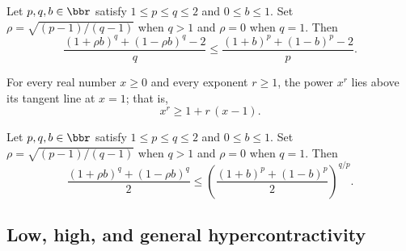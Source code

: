 \begin{lemma}
\label{BooleanAnalysis.Hypercontractivity.integrated_h_alpha_ineq}
\leanok
{}
Let $p,q,b\in\bbr$ satisfy $1\le p\le q\le2$ and $0\le b\le1$.
Set $\rho=\sqrt{(p-1)/(q-1)}$ when $q>1$ and $\rho=0$ when $q=1$. Then
\[
  \frac{(1+\rho b)^q+(1-\rho b)^q-2}{q}
  \le\frac{(1+b)^p+(1-b)^p-2}{p}.
\]
\end{lemma}

\begin{lemma}[Tangent line inequality for $x^r$ at $x=1$]
\label{BooleanAnalysis.Hypercontractivity.rpow_ge_one_add_mul_sub}
\leanok
{}
For every real number $x \ge 0$ and every exponent $r \ge 1$, the power $x^r$ lies above
its tangent line at $x = 1$; that is,
\[
x^r \ge 1 + r\,(x - 1).
\]
\end{lemma}

\begin{theorem}
\label{BooleanAnalysis.Hypercontractivity.two_point_ineq_general_unit}
\leanok
{}
Let $p,q,b\in\bbr$ satisfy $1\le p\le q\le2$ and $0\le b\le1$.
Set $\rho=\sqrt{(p-1)/(q-1)}$ when $q>1$ and $\rho=0$ when $q=1$. Then
\[
  \frac{(1+\rho b)^q+(1-\rho b)^q}{2}
  \le\left(\frac{(1+b)^p+(1-b)^p}{2}\right)^{q/p}.
\]
\end{theorem}

\subsection{Low, high, and general hypercontractivity}


